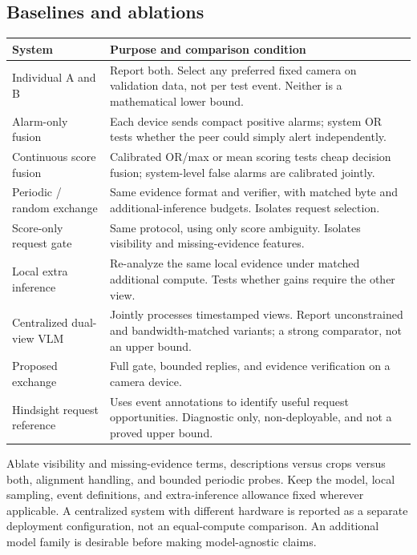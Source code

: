 \documentclass[10pt,a4paper]{article}
\begin{document}
\subsection{Baselines and ablations}
\begin{center}
\small
\begin{tabularx}{\linewidth}[t]{@{}>{\raggedright\arraybackslash}p{36mm}Y@{}}
\toprule
System & Purpose and comparison condition \\
\midrule
Individual A and B & Report both. Select any preferred fixed camera on validation data, not per test event. Neither is a mathematical lower bound. \\
Alarm-only fusion & Each device sends compact positive alarms; system OR tests whether the peer could simply alert independently. \\
Continuous score fusion & Calibrated OR/max or mean scoring tests cheap decision fusion; system-level false alarms are calibrated jointly. \\
Periodic / random exchange & Same evidence format and verifier, with matched byte and additional-inference budgets. Isolates request selection. \\
Score-only request gate & Same protocol, using only score ambiguity. Isolates visibility and missing-evidence features. \\
Local extra inference & Re-analyze the same local evidence under matched additional compute. Tests whether gains require the other view. \\
Centralized dual-view VLM & Jointly processes timestamped views. Report unconstrained and bandwidth-matched variants; a strong comparator, not an upper bound. \\
Proposed exchange & Full gate, bounded replies, and evidence verification on a camera device. \\
Hindsight request reference & Uses event annotations to identify useful request opportunities. Diagnostic only, non-deployable, and not a proved upper bound. \\
\bottomrule
\end{tabularx}
\end{center}

Ablate visibility and missing-evidence terms, descriptions versus crops versus both, alignment handling, and bounded periodic probes. Keep the model, local sampling, event definitions, and extra-inference allowance fixed wherever applicable. A centralized system with different hardware is reported as a separate deployment configuration, not an equal-compute comparison. An additional model family is desirable before making model-agnostic claims.
\end{document}
